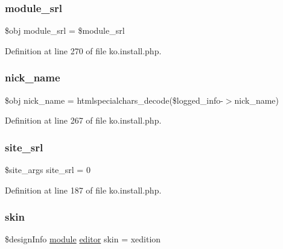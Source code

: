 \subsubsection{\texorpdfstring{module\+\_\+srl}{module\_srl}}
{\footnotesize\ttfamily \$obj module\+\_\+srl = \$module\+\_\+srl}



Definition at line 270 of file ko.\+install.\+php.

\hypertarget{ko_8install_8php_a151ecae87a1f3d7e257aa089803086bd}{}\label{ko_8install_8php_a151ecae87a1f3d7e257aa089803086bd} 
\subsubsection{\texorpdfstring{nick\+\_\+name}{nick\_name}}
{\footnotesize\ttfamily \$obj nick\+\_\+name = htmlspecialchars\+\_\+decode(\$logged\+\_\+info-\/$>$nick\+\_\+name)}



Definition at line 267 of file ko.\+install.\+php.

\hypertarget{ko_8install_8php_a8b1406b4ad1048041558dce6bfe89004}{}\label{ko_8install_8php_a8b1406b4ad1048041558dce6bfe89004} 
\subsubsection{\texorpdfstring{site\+\_\+srl}{site\_srl}}
{\footnotesize\ttfamily \$site\+\_\+args site\+\_\+srl = 0}



Definition at line 187 of file ko.\+install.\+php.

\hypertarget{ko_8install_8php_ab0f2b49fdb57754496b34f6b880cdeaf}{}\label{ko_8install_8php_ab0f2b49fdb57754496b34f6b880cdeaf} 
\subsubsection{\texorpdfstring{skin}{skin}}
{\footnotesize\ttfamily \$design\+Info \hyperlink{classmodule}{module} \hyperlink{classeditor}{editor} skin = \textquotesingle{}xedition\textquotesingle{}}



